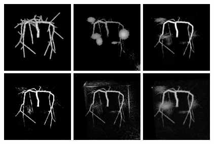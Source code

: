 \begin{figure}[H]
  \centering
  
  \includegraphics[clip = true, trim = 80 80 80 80, height=3.5cm]{Images/Vascu_4_GT.png}
  \includegraphics[clip = true, trim = 80 80 80 80, height=3.5cm]{Images/Vascu_4_Baseline.png}
  \includegraphics[clip = true, trim = 80 80 80 80, height=3.5cm]{Images/Vascu_4_Frangi.png}
  \\
  \includegraphics[clip = true, trim = 80 80 80 80, height=3.5cm]{Images/Vascu_4_Jerman.png}
  \includegraphics[clip = true, trim = 80 80 80 80, height=3.5cm]{Images/Vascu_4_OOF_GM.png}
  \includegraphics[clip = true, trim = 80 80 80 80, height=3.5cm]{Images/Vascu_4_Meijering.png}

\end{figure}
